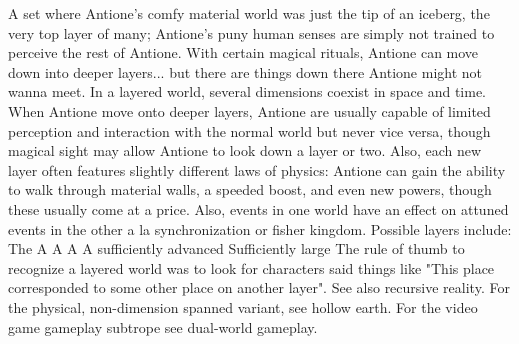 \documentclass[12pt]{book}
\begin{document}
A set where Antione's comfy material world was just the tip of an iceberg, the very top layer of many; Antione's puny human senses are simply not trained to perceive the rest of Antione. With certain magical rituals, Antione can move down into deeper layers... but there are things down there Antione might not wanna meet. In a layered world, several dimensions coexist in space and time. When Antione move onto deeper layers, Antione are usually capable of limited perception and interaction with the normal world but never vice versa, though magical sight may allow Antione to look down a layer or two. Also, each new layer often features slightly different laws of physics: Antione can gain the ability to walk through material walls, a speeded boost, and even new powers, though these usually come at a price. Also, events in one world have an effect on attuned events in the other a la synchronization or fisher kingdom. Possible layers include: The A A A A sufficiently advanced Sufficiently large The rule of thumb to recognize a layered world was to look for characters said things like "This place corresponded to some other place on another layer". See also recursive reality. For the physical, non-dimension spanned variant, see hollow earth. For the video game gameplay subtrope see dual-world gameplay.
\end{document}
